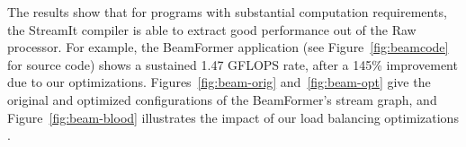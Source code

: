 The results show that for programs with substantial computation
requirements, the StreamIt compiler is able to extract good
performance out of the Raw processor.  For example, the BeamFormer
application (see Figure~\ref{fig:beamcode} for source code) shows a
sustained 1.47 GFLOPS rate, after a 145\% improvement due to our
optimizations.  Figures~\ref{fig:beam-orig} and~\ref{fig:beam-opt}
give the original and optimized configurations of the BeamFormer's
stream graph, and Figure~\ref{fig:beam-blood} illustrates the impact
of our load balancing optimizations .
%

